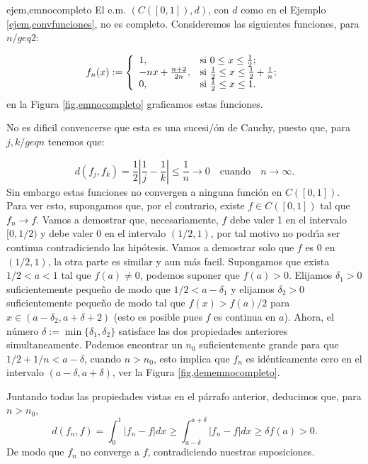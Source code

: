 \begin{ejemplo}{ejem,emnocompleto} El e.m. $(C([0,1]),d)$, con $d$ como en el Ejemplo
\vref{ejem,convfunciones}, no es completo. Consideremos las
siguientes funciones, para $n/geq 2$:

\[
    f_n(x):=\left\{
                \begin{array}{ll}
                        1, & \hbox{si $0\leq x\leq \frac12$;} \\
                        -nx+\frac{n+2}{2n}, & \hbox{si $\frac12\leq x\leq \frac12+\frac1{n}$;} \\
                        0, & \hbox{si $\frac12\leq x\leq 1$.} \\
\end{array}
\right.
\]
 en la Figura \vref{fig,emnocompleto} graficamos estas
funciones.

No es dificil convencerse que esta es una sucesi/ón de Cauchy,
puesto que, para $j,k/geq n$ tenemos que:

\[
    d(f_j,f_k)=\frac12|\frac1j-\frac1k|\leq \frac1n\rightarrow
    0\quad\text{cuando}\quad n\rightarrow \infty.
\]
Sin embargo estas funciones no convergen a ninguna función en
$C([0,1])$. Para ver esto, supongamos que, por el contrario,
existe $f\in C([0,1])$ tal que $f_n\rightarrow f$. Vamos a
demostrar que, necesariamente, $f$ debe valer 1 en el intervalo
$[0,1/2)$ y debe valer 0 en el intervalo $(1/2,1)$, por tal motivo
no podr\'{\i}a ser continua contradiciendo las hipótesis. Vamos
a demostrar solo que $f$ es 0 en $(1/2,1)$, la otra parte es
similar y aun más facil. Supongamos que exista $1/2<a<1$ tal que
$f(a)\neq 0$, podemos suponer que $f(a)>0$. Elijamos $\delta_1>0$
suficientemente peque\~no de modo que $1/2<a-\delta_1$ y elijamos
$\delta_2>0$ suficientemente peque\~no de modo tal que
$f(x)>f(a)/2$ para $x\in(a-\delta_2,a+\delta+2)$ (esto es posible
pues $f$ es continua en $a$). Ahora, el número
$\delta:=\min\{\delta_1,\delta_2\}$ satisface las dos propiedades
anteriores simultaneamente. Podemos encontrar un $n_0$
suficientemente grande para que $1/2+1/n<a-\delta$, cuando
$n>n_0$, esto implica que $f_n$ es idénticamente cero en el
intervalo $(a-\delta,a+\delta)$, ver la Figura
\vref{fig,dememnocompleto}.

Juntando todas las propiedades vistas en el párrafo anterior,
deducimos que, para $n>n_0$,
\[
    d(f_n,f)=\int_0^1|f_n-f|dx\geq\int_{a-\delta}^{a+\delta}|f_n-f|dx\geq
    \delta f(a)>0.
\]
De modo que $f_n$ no converge a $f$, contradiciendo nuestras
suposiciones.
\end{ejemplo}


